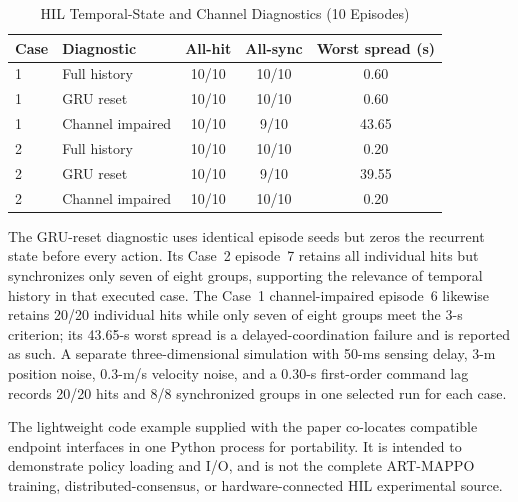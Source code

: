 \documentclass[lettersize,journal]{IEEEtran}
\providecommand{\DIFadd}[1]{{\protect\color{blue} #1}} %
\providecommand{\DIFaddend}{} %
\providecommand{\DIFaddFL}[1]{\DIFadd{#1}} %
\begin{document}
\begin{table}[!t]
\centering
\caption{\DIFaddFL{HIL Temporal-State and Channel Diagnostics (10 Episodes)}}
\label{tab:hil_results}
\footnotesize
\setlength{\tabcolsep}{3pt}
\begin{tabular}{llccc}
\toprule
\DIFaddFL{Case }& \DIFaddFL{Diagnostic }& \DIFaddFL{All-hit }& \DIFaddFL{All-sync }& \DIFaddFL{Worst spread (s) }\\
\midrule
\DIFaddFL{1 }& \DIFaddFL{Full history }& \DIFaddFL{10/10 }& \DIFaddFL{10/10 }& \DIFaddFL{0.60 }\\
\DIFaddFL{1 }& \DIFaddFL{GRU reset }& \DIFaddFL{10/10 }& \DIFaddFL{10/10 }& \DIFaddFL{0.60 }\\
\DIFaddFL{1 }& \DIFaddFL{Channel impaired }& \DIFaddFL{10/10 }& \DIFaddFL{9/10 }& \DIFaddFL{43.65 }\\
\DIFaddFL{2 }& \DIFaddFL{Full history }& \DIFaddFL{10/10 }& \DIFaddFL{10/10 }& \DIFaddFL{0.20 }\\
\DIFaddFL{2 }& \DIFaddFL{GRU reset }& \DIFaddFL{10/10 }& \DIFaddFL{9/10 }& \DIFaddFL{39.55 }\\
\DIFaddFL{2 }& \DIFaddFL{Channel impaired }& \DIFaddFL{10/10 }& \DIFaddFL{10/10 }& \DIFaddFL{0.20 }\\
\bottomrule
\end{tabular}
\end{table}

\DIFadd{The GRU-reset diagnostic uses identical episode seeds but zeros the recurrent
state before every action. Its Case~2 episode~7 retains all individual hits but
synchronizes only seven of eight groups, supporting the relevance of temporal
history in that executed case. The Case~1 channel-impaired episode~6 likewise
retains 20/20 individual hits while only seven of eight groups meet the 3-s
criterion; its 43.65-s worst spread is a delayed-coordination failure and is
reported as such. A separate three-dimensional simulation with 50-ms sensing
delay, 3-m position noise, 0.3-m/s velocity noise, and a 0.30-s first-order
command lag records 20/20 hits and 8/8 synchronized groups in one selected run
for each case.
}

\DIFadd{The lightweight code example supplied with the paper co-locates compatible
endpoint interfaces in one Python process for portability. It is intended to
demonstrate policy loading and I/O, and is not the complete ART-MAPPO training,
distributed-consensus, or hardware-connected HIL experimental source.
}



\DIFaddend %
\end{document}
